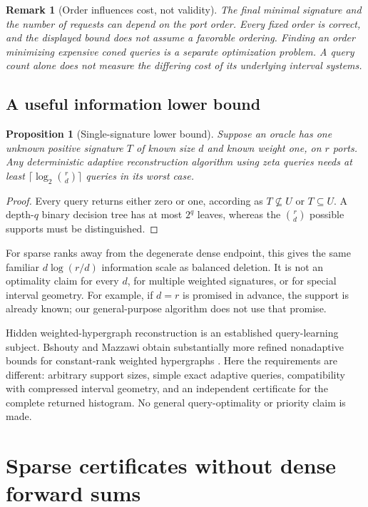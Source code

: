 \documentclass[11pt,letterpaper]{article}
\newtheorem{proposition}[theorem]{Proposition}
\newtheorem{remark}[theorem]{Remark}
\begin{document}
\begin{remark}[Order influences cost, not validity]
The final minimal signature and the number of requests can depend on the
port order. Every fixed order is correct, and the displayed bound does not
assume a favorable ordering. Finding an order minimizing expensive coned
queries is a separate optimization problem. A query count alone does not
measure the differing cost of its underlying interval systems.
\end{remark}

\subsection{A useful information lower bound}
\begin{proposition}[Single-signature lower bound]
\label{prop:lower}
Suppose an oracle has one unknown positive signature $T$ of known size $d$
and known weight one, on $r$ ports. Any deterministic adaptive reconstruction
algorithm using zeta queries needs at least
$\lceil\log_2\binom rd\rceil$ queries in its worst case.
\end{proposition}
\begin{proof}
Every query returns either zero or one, according as $T\not\subseteq U$ or
$T\subseteq U$. A depth-$q$ binary decision tree has at most $2^q$ leaves,
whereas the $\binom rd$ possible supports must be distinguished.
\end{proof}

For sparse ranks away from the degenerate dense endpoint, this gives the
same familiar $d\log(r/d)$ information scale as balanced deletion. It is not
an optimality claim for every $d$, for multiple weighted signatures, or for
special interval geometry. For example, if $d=r$ is promised in advance,
the support is already known; our general-purpose algorithm does not use
that promise.

Hidden weighted-hypergraph reconstruction is an established query-learning
subject. Bshouty and Mazzawi obtain substantially more refined nonadaptive
bounds for constant-rank weighted hypergraphs \cite{bshouty}. Here the
requirements are different: arbitrary support sizes, simple exact adaptive
queries, compatibility with compressed interval geometry, and an independent
certificate for the complete returned histogram. No general query-optimality
or priority claim is made.

\section{Sparse certificates without dense forward sums}
\label{sec:certificates}
\end{document}
